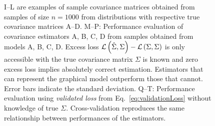 \begin{figure}[htp]
{{\sf I--L} are examples of sample covariance matrices obtained from samples of size $n=1000$ from distributions with respective true covariance matrices A--D.
{\sf M--P:} Performance evaluation of covariance estimators A, B, C, D from samples obtained from models A, B, C, D.  Excess loss $\mathcal L\left(\hat\Sigma,\Sigma\right)-\mathcal L\left(\Sigma,\Sigma\right)$ is only accessible with the true covariance matrix $\Sigma$ is known and zero excess loss implies absolutely correct estimation. Estimators that can represent the graphical model outperform those that cannot.  Error bars indicate the standard deviation. 
{\sf Q--T:} Performance evaluation using \emph{validated loss} from Eq.~\ref{eq:validationLoss} without knowledge of true $\Sigma$. Cross-validation reproduces the same relationship between performances of the estimators.
}\label{fig:03}
\end{figure}